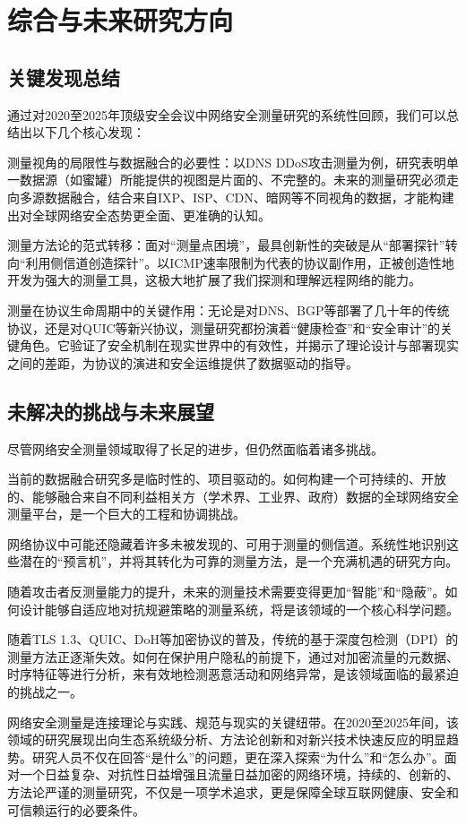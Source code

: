 \documentclass[conference]{IEEEtran}
\begin{document}
\section{综合与未来研究方向}
\subsection{关键发现总结}
通过对2020至2025年顶级安全会议中网络安全测量研究的系统性回顾，我们可以总结出以下几个核心发现：

测量视角的局限性与数据融合的必要性：以DNS DDoS攻击测量为例，研究表明单一数据源（如蜜罐）所能提供的视图是片面的、不完整的。未来的测量研究必须走向多源数据融合，结合来自IXP、ISP、CDN、暗网等不同视角的数据，才能构建出对全球网络安全态势更全面、更准确的认知。

测量方法论的范式转移：面对“测量点困境”，最具创新性的突破是从“部署探针”转向“利用侧信道创造探针”。以ICMP速率限制为代表的协议副作用，正被创造性地开发为强大的测量工具，这极大地扩展了我们探测和理解远程网络的能力。

测量在协议生命周期中的关键作用：无论是对DNS、BGP等部署了几十年的传统协议，还是对QUIC等新兴协议，测量研究都扮演着“健康检查”和“安全审计”的关键角色。它验证了安全机制在现实世界中的有效性，并揭示了理论设计与部署现实之间的差距，为协议的演进和安全运维提供了数据驱动的指导。
\subsection{未解决的挑战与未来展望}
尽管网络安全测量领域取得了长足的进步，但仍然面临着诸多挑战。

当前的数据融合研究多是临时性的、项目驱动的。如何构建一个可持续的、开放的、能够融合来自不同利益相关方（学术界、工业界、政府）数据的全球网络安全测量平台，是一个巨大的工程和协调挑战。

网络协议中可能还隐藏着许多未被发现的、可用于测量的侧信道。系统性地识别这些潜在的“预言机”，并将其转化为可靠的测量方法，是一个充满机遇的研究方向。

随着攻击者反测量能力的提升，未来的测量技术需要变得更加“智能”和“隐蔽”。如何设计能够自适应地对抗规避策略的测量系统，将是该领域的一个核心科学问题。

 随着TLS 1.3、QUIC、DoH等加密协议的普及，传统的基于深度包检测（DPI）的测量方法正逐渐失效。如何在保护用户隐私的前提下，通过对加密流量的元数据、时序特征等进行分析，来有效地检测恶意活动和网络异常，是该领域面临的最紧迫的挑战之一。

网络安全测量是连接理论与实践、规范与现实的关键纽带。在2020至2025年间，该领域的研究展现出向生态系统级分析、方法论创新和对新兴技术快速反应的明显趋势。研究人员不仅在回答“是什么”的问题，更在深入探索“为什么”和“怎么办”。面对一个日益复杂、对抗性日益增强且流量日益加密的网络环境，持续的、创新的、方法论严谨的测量研究，不仅是一项学术追求，更是保障全球互联网健康、安全和可信赖运行的必要条件。
\end{document}

